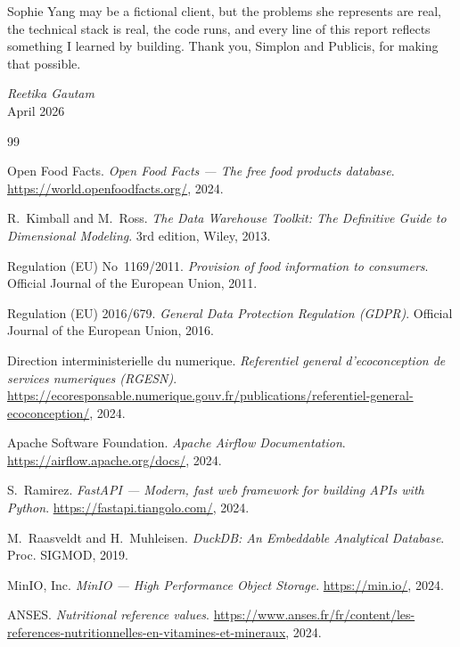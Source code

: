 \documentclass[a4paper,11pt,oneside,openany]{report}
\begin{document}
\vspace{0.3cm}

\noindent Sophie Yang may be a fictional client, but the problems
she represents are real, the technical stack is real, the code
runs, and every line of this report reflects something I learned
by building. Thank you, Simplon and Publicis, for making that
possible.

\vspace{0.8cm}

\begin{center}
\textit{Reetika Gautam} \\
April 2026
\end{center}

\clearpage


\begin{thebibliography}{99}

Open Food Facts.
\textit{Open Food Facts --- The free food products database}.
\url{https://world.openfoodfacts.org/}, 2024.

R.~Kimball and M.~Ross.
\textit{The Data Warehouse Toolkit: The Definitive Guide to Dimensional
Modeling}. 3rd edition, Wiley, 2013.

Regulation (EU) No~1169/2011.
\textit{Provision of food information to consumers}.
Official Journal of the European Union, 2011.

Regulation (EU) 2016/679.
\textit{General Data Protection Regulation (GDPR)}.
Official Journal of the European Union, 2016.

Direction interministerielle du numerique.
\textit{Referentiel general d'ecoconception de services numeriques
(RGESN)}.
\url{https://ecoresponsable.numerique.gouv.fr/publications/referentiel-general-ecoconception/}, 2024.

Apache Software Foundation.
\textit{Apache Airflow Documentation}.
\url{https://airflow.apache.org/docs/}, 2024.

S.~Ramirez.
\textit{FastAPI --- Modern, fast web framework for building APIs with Python}.
\url{https://fastapi.tiangolo.com/}, 2024.

M.~Raasveldt and H.~Muhleisen.
\textit{DuckDB: An Embeddable Analytical Database}.
Proc. SIGMOD, 2019.

MinIO, Inc.
\textit{MinIO --- High Performance Object Storage}.
\url{https://min.io/}, 2024.

ANSES.
\textit{Nutritional reference values}.
\url{https://www.anses.fr/fr/content/les-references-nutritionnelles-en-vitamines-et-mineraux}, 2024.

\end{thebibliography}
\end{document}
